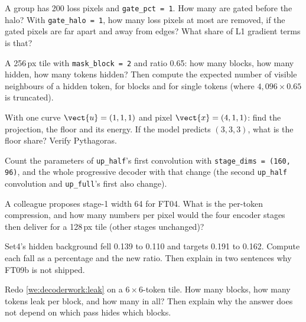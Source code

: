 \begin{checkyourself}
\item\label{ex:decoderwork:1} A group has 200 loss pixels and \texttt{gate\_pct = 1}. How many are gated before
the halo? With \texttt{gate\_halo = 1}, how many loss pixels at most are removed, if the gated pixels are far apart
and away from edges? What share of L1 gradient terms is that?
\item\label{ex:decoderwork:2} A 256\,px tile with \texttt{mask\_block = 2} and ratio 0.65: how many blocks, how many
hidden, how many tokens hidden? Then compute the expected number of visible neighbours of a hidden token, for
blocks and for single tokens (where $4{,}096\times0.65$ is truncated).
\item\label{ex:decoderwork:3} With one curve $\vect{u}=(1,1,1)$ and pixel $\vect{x}=(4,1,1)$: find the projection,
the floor and its energy. If the model predicts $(3,3,3)$, what is the floor share? Verify Pythagoras.
\item\label{ex:decoderwork:4} Count the parameters of \texttt{up\_half}'s first convolution with
\texttt{stage\_dims = (160, 96)}, and the whole progressive decoder with that change (the second \texttt{up\_half}
convolution and \texttt{up\_full}'s first also change).
\item\label{ex:decoderwork:5} A colleague proposes stage-1 width 64 for FT04. What is the per-token compression,
and how many numbers per pixel would the four encoder stages then deliver for a 128\,px tile (other stages
unchanged)?
\item\label{ex:decoderwork:6} Set4's hidden background fell 0.139 to 0.110 and targets 0.191 to 0.162. Compute
each fall as a percentage and the new ratio. Then explain in two sentences why FT09b is not shipped.
\item\label{ex:decoderwork:7} Redo \cref{we:decoderwork:leak} on a $6\times6$-token tile. How many blocks, how
many tokens leak per block, and how many in all? Then explain why the answer does not depend on which pass hides
which blocks.
\end{checkyourself}

